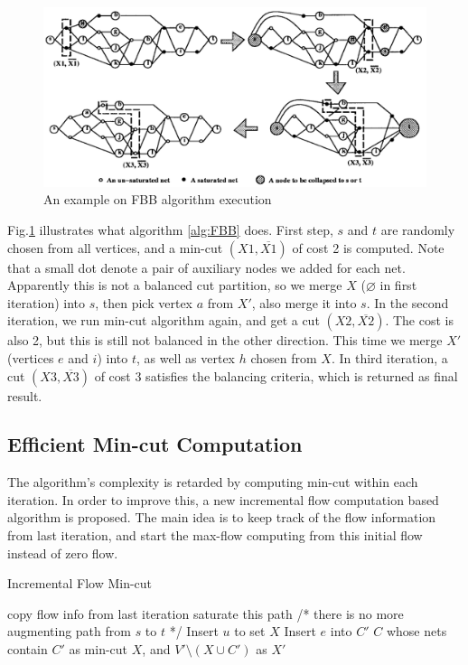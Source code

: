 \documentclass[conference,10pt]{IEEEtran}
\begin{document}
\begin{figure}[hbt]
	\begin{center}
	\includegraphics[width=5in]{figfbb.png}
	\end{center}
	\caption{An example on FBB algorithm execution}
	\label{fig:FBB}
\end{figure}

Fig.\ref{fig:FBB} illustrates what algorithm \ref{alg:FBB} does. First step, $s$ and $t$ are randomly chosen
from all vertices, and a min-cut $(X1,\overline{X1})$ of cost 2 is computed. Note that a small dot denote
a pair of auxiliary nodes we added for each net. Apparently this is not a balanced cut 
partition, so we merge $X$ ($\varnothing$ in first iteration) into $s$, then pick vertex $a$ from $X'$, also
merge it into $s$. In the second iteration, we run min-cut algorithm again, and get a cut $(X2,\overline{X2})$.
The cost is also 2, but this is still not balanced in the other direction. This time we merge $X'$ 
(vertices $e$ and $i$) into $t$, as well as vertex $h$ chosen from $X$. In third iteration, a cut $(X3,\overline{X3})$ of cost 3 satisfies the balancing criteria, which is returned as final result.

\subsection{Efficient Min-cut Computation}
The algorithm's complexity is retarded by computing min-cut within each iteration. In order to improve this,
a new incremental flow computation based algorithm is proposed. The main idea is to keep track of the flow
information from last iteration, and start the max-flow computing from this initial flow instead of zero flow.

\begin{algorithm}
\caption{Incremental Flow Min-cut}
\label{alg:incflow}
\begin{algorithmic}[1]
	\State copy flow info from last iteration
  	\State saturate this path
  \EndWhile
  \Comment/* there is no more augmenting path from $s$ to $t$ */
  		\State Insert $u$ to set $X$
  	\EndIf
  \EndFor
  		\State Insert $e$ into $C'$
  	\EndIf
  \EndFor
  \State \Return $C$ whose nets contain $C'$ as min-cut
  \State \Return $X$, and $V'\setminus(X\cup C')$ as $X'$
\EndFunction
\end{algorithmic}
\end{algorithm}
\end{document}
